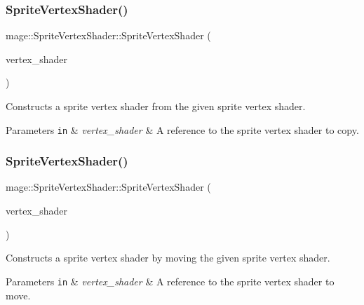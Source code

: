 \subsubsection{\texorpdfstring{Sprite\+Vertex\+Shader()}{SpriteVertexShader()}\hspace{0.1cm}{\footnotesize\ttfamily [5/6]}}
{\footnotesize\ttfamily mage\+::\+Sprite\+Vertex\+Shader\+::\+Sprite\+Vertex\+Shader (\begin{DoxyParamCaption}\item[{const \hyperlink{classmage_1_1_sprite_vertex_shader}{Sprite\+Vertex\+Shader} \&}]{vertex\+\_\+shader }\end{DoxyParamCaption})\hspace{0.3cm}{\ttfamily [delete]}}

Constructs a sprite vertex shader from the given sprite vertex shader.


\begin{DoxyParams}[1]{Parameters}
\mbox{\tt in}  & {\em vertex\+\_\+shader} & A reference to the sprite vertex shader to copy. \\
\hline
\end{DoxyParams}
\hypertarget{classmage_1_1_sprite_vertex_shader_abc0c5838e2b1941b6a55dbe238e5b6f6}{}\label{classmage_1_1_sprite_vertex_shader_abc0c5838e2b1941b6a55dbe238e5b6f6} 
\subsubsection{\texorpdfstring{Sprite\+Vertex\+Shader()}{SpriteVertexShader()}\hspace{0.1cm}{\footnotesize\ttfamily [6/6]}}
{\footnotesize\ttfamily mage\+::\+Sprite\+Vertex\+Shader\+::\+Sprite\+Vertex\+Shader (\begin{DoxyParamCaption}\item[{\hyperlink{classmage_1_1_sprite_vertex_shader}{Sprite\+Vertex\+Shader} \&\&}]{vertex\+\_\+shader }\end{DoxyParamCaption})\hspace{0.3cm}{\ttfamily [default]}}

Constructs a sprite vertex shader by moving the given sprite vertex shader.


\begin{DoxyParams}[1]{Parameters}
\mbox{\tt in}  & {\em vertex\+\_\+shader} & A reference to the sprite vertex shader to move. \\
\hline
\end{DoxyParams}
\hypertarget{classmage_1_1_sprite_vertex_shader_a36e755541ea81318ccf518533358e0d3}{}\label{classmage_1_1_sprite_vertex_shader_a36e755541ea81318ccf518533358e0d3} 
